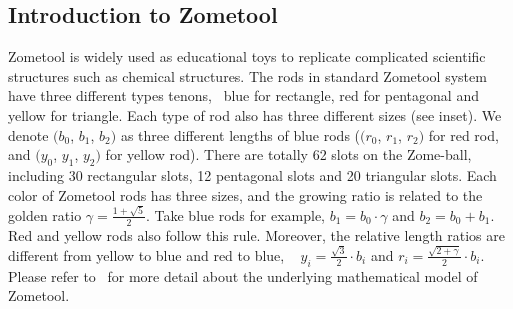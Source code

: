 \subsection{Introduction to Zometool}
Zometool is widely used as educational toys to replicate complicated scientific structures such as chemical structures. 
The rods in standard Zometool system have three different types tenons, \ie~blue for rectangle, red for pentagonal and yellow for triangle.
Each type of rod also has three different sizes (see inset).
We denote $(b_0$, $b_1$, $b_2)$ as three different lengths of blue rods ($(r_0$, $r_1$, $r_2)$ for red rod, and $(y_0$, $y_1$, $y_2)$ for yellow rod).
There are totally 62 slots on the Zome-ball, including 30 rectangular slots, 12 pentagonal slots and 20 triangular slots. 
Each color of Zometool rods has three sizes, and the growing ratio is related to the golden ratio $\gamma = \frac{1+\sqrt{5}}{2}$. 
Take blue rods for example, $b_1 = b_0 \cdot \gamma$ and $b_2 = b_0 + b_1$. 
Red and yellow rods also follow this rule. 
Moreover, the relative length ratios are different from yellow to blue and red to blue, \ie~ $y_i = \frac{\sqrt{3}}{2} \cdot b_i$ and $r_i = \frac{\sqrt{2 + \gamma}}{2} \cdot b_i$.
Please refer to~\cite{davis2007mathematics} for more detail about the underlying mathematical model of Zometool.


